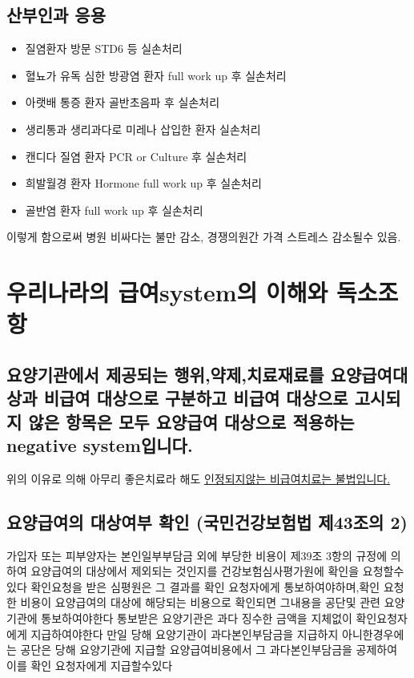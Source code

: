 \subsection{산부인과 응용}
\begin{mdframed}[linecolor=blue,middlelinewidth=2]
\begin{itemize}\tightlist
\item 질염환자 방문 \MVRightarrow STD6 등 실손처리
\item 혈뇨가 유독 심한 방광염 환자 \MVRightarrow full work up 후 실손처리
\item 아랫배 통증 환자 \MVRightarrow 골반초음파 후 실손처리
\item 생리통과 생리과다로 미레나 삽입한 환자 \MVRightarrow 실손처리
\item 캔디다 질염 환자 \MVRightarrow PCR or Culture 후 실손처리
\item 희발월경 환자 \MVRightarrow Hormone full work up 후 실손처리
\item 골반염 환자 \MVRightarrow full work up 후 실손처리
\end{itemize}
\end{mdframed}
이렇게 함으로써 병원 비싸다는 불만 감소, 경쟁의원간 가격 스트레스 감소될수 있음.
\clearpage

\section{우리나라의 급여system의 이해와 독소조항}
\subsection{요양기관에서 제공되는 행위,약제,치료재료를 요양급여대상과 비급여 대상으로 구분하고 비급여 대상으로 고시되지 않은 항목은 모두 요양급여 대상으로 적용하는 negative system입니다.}
위의 이유로 의해 아무리 좋은치료라 해도 \uline{인정되지않는 비급여치료는 불법입니다.}
\subsection{요양급여의 대상여부 확인 (국민건강보험법 제43조의 2)}
가입자 또는 피부양자는 본인일부부담금
   외에 부당한 비용이 제39조 3항의 규정에 의하여 요양급여의 대상에서 제외되는 것인지를 건강보험심사평가원에 확인을 요청할수 있다
 확인요청을 받은 심평원은 그 결과를 확인 요청자에게 통보하여야하며,확인 요청한 비용이 요양급여의 대상에 해당되는 비용으로 확인되면 그내용을 공단및 관련 요양기관에 통보하여야한다 
통보받은 요양기관은 과다 징수한 금액을 지체없이 확인요청자에게 지급하여야한다
만일 당해 요양기관이 과다본인부담금을 지급하지 아니한경우에는 공단은 당해 요양기관에 지급할 요양급여비용에서 그 과다본인부담금을 공제하여 이를 확인 요청자에게 지급할수있다
